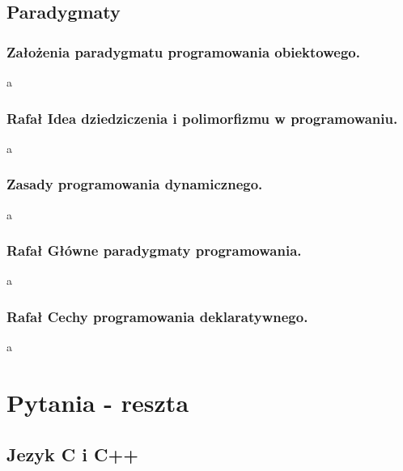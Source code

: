 \documentclass[a4paper,12pt,oneside]{book}
\begin{document}
		\newpage\section{Paradygmaty}
			\subsection{\color{red}Założenia paradygmatu programowania obiektowego.}
				a
			\newpage\subsection{\color{green} Rafał \color{red}Idea dziedziczenia i polimorfizmu w programowaniu.}
				a
			\newpage\subsection{\color{red}Zasady programowania dynamicznego.}
				a
			\newpage\subsection{\color{green} Rafał \color{red}Główne paradygmaty programowania.}
				a
			\newpage\subsection{\color{green} Rafał \color{red}Cechy programowania deklaratywnego.}
				a
	
	\chapter{Pytania - reszta}
	
		\section{Jezyk C i C++}
\end{document}
